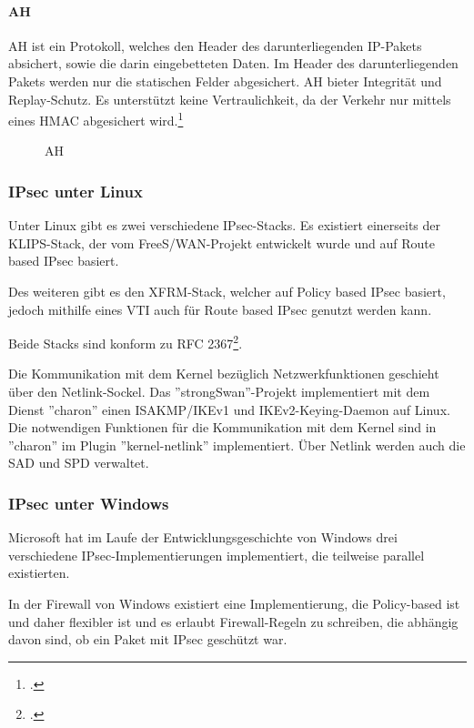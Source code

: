 \paragraph{AH}
\ac{AH} ist ein Protokoll, welches den Header des darunterliegenden \ac{IP}-Pakets absichert,
sowie die darin eingebetteten Daten. Im Header des darunterliegenden Pakets werden nur die statischen Felder
abgesichert. \ac{AH} bieter Integrität und Replay-Schutz. Es unterstützt keine Vertraulichkeit, da
der Verkehr nur mittels eines \ac{HMAC} abgesichert wird.\footcite[][]{stephen_kent_rfc_2005-1}
\begin{figure}
    \label{fig:AH}
    \centering
    \def\svgwidth{\columnwidth}
    
    \caption{\ac{AH}}
\end{figure}

\subsubsection{IPsec unter Linux}
Unter Linux gibt es zwei verschiedene \ac{IPsec}-Stacks.
Es existiert einerseits der KLIPS-Stack, der vom FreeS/WAN-Projekt entwickelt wurde
und auf Route based IPsec basiert.

Des weiteren gibt es den XFRM-Stack, welcher auf Policy based IPsec basiert, jedoch mithilfe eines \ac{VTI}
auch für Route based IPsec genutzt werden kann.

Beide Stacks sind konform zu RFC 2367\footcite[][]{daniel_l._mcdonald_rfc_1998}.

Die Kommunikation mit dem Kernel bezüglich Netzwerkfunktionen geschieht über
den Netlink-Sockel. 
Das ''strongSwan''-Projekt implementiert mit dem Dienst ''charon'' einen \ac{ISAKMP}/IKEv1 und IKEv2-Keying-Daemon
auf Linux.
Die notwendigen Funktionen für die Kommunikation mit dem Kernel sind in ''charon'' im Plugin ''kernel-netlink'' implementiert.
Über Netlink werden auch die \ac{SAD} und \ac{SPD} verwaltet.

\subsubsection{IPsec unter Windows}
Microsoft hat im Laufe der Entwicklungsgeschichte von Windows drei verschiedene
\ac{IPsec}-Implementierungen implementiert, die teilweise parallel existierten.

In der Firewall von Windows existiert eine Implementierung, die Policy-based ist
und daher flexibler ist und es erlaubt Firewall-Regeln zu schreiben, die abhängig davon sind,
ob ein Paket mit \ac{IPsec} geschützt war.

